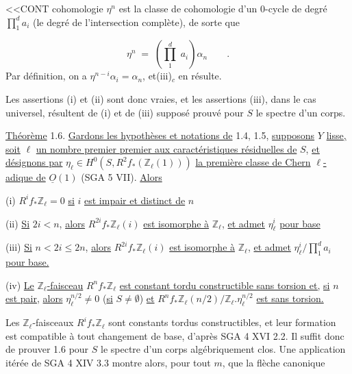 
<<CONT cohomologie $\eta^n$ est la classe de cohomologie d'un $0$-cycle de degré $\prod_1^d a_i$ (le degré de l'intersection complète), de sorte que

\begin{equation*}
\eta^n \;=\; \left( \prod_1^d \; a_i \right) \alpha_n \qquad .
\end{equation*}
Par définition, on a $\eta^{n-i} \alpha_i = \alpha_n$, et(iii)$_c$ en résulte.

Les assertions (i) et (ii) sont donc vraies, et les assertions (iii), dans le cas universel, résultent de (i) et de (iii) supposé prouvé pour $S$ le spectre d'un corps.

\underline{Théorème} 1.6. \underline{Gardons les hypothèses et notations de} 1.4, 1.5, \underline{supposons} $Y$ \underline{lisse,} \underline{soit} $\ell$ \underline{un nombre premier premier aux caractéristiques résiduelles de} $S$, \underline{et désignons par} $\eta_\ell \in H^0(S,R^2 f_*( \mathbb{Z}_\ell(1)))$ \underline{la première classe de Chern} $\ell$\underline{-adique de} $\underline{O}(1)$ (SGA 5 VII). \underline{Alors}

(i) $R^i f_* \mathbb{Z}_\ell = 0$ \underline{si} $i$ \underline{est impair et distinct de} $n$

(ii) \underline{Si} $2i < n$, \underline{alors} $R^{2i} f_* \mathbb{Z}_\ell(i)$ \underline{est isomorphe à} $\mathbb{Z}_\ell$, \underline{et admet} $\eta_\ell^i$ \underline{pour base}

(iii) \underline{Si} $n < 2i \leq 2n$, \underline{alors} $R^{2i} f_* \mathbb{Z}_\ell(i)$ \underline{est isomorphe à} $\mathbb{Z}_\ell$, \underline{et admet} $\eta_\ell^i / \prod_1^d a_i$ \underline{pour base.}

(iv) \underline{Le} $\mathbb{Z}_\ell$\underline{-faisceau} $R^n f_* \mathbb{Z}_\ell$ \underline{est constant tordu constructible sans torsion et,} \underline{si} $n$ \underline{est pair,} \underline{alors} $\eta_\ell^{n/2} \neq 0$ (\underline{si} $S \neq \emptyset$) \underline{et} $R^n f_* \mathbb{Z}_\ell(n/2)/ \mathbb{Z}_\ell . \eta_\ell^{n/2}$ \underline{est sans torsion.}

Les $\mathbb{Z}_\ell$-faisceaux $R^i f_* \mathbb{Z}_\ell$ sont constants tordus constructibles, et leur formation est compatible à tout changement de base, d'après SGA 4 XVI 2.2. Il suffit donc de prouver 1.6 pour $S$ le spectre d'un corps algébriquement clos. Une application itérée de SGA 4 XIV 3.3 montre alors, pour tout $m$, que la flèche canonique

